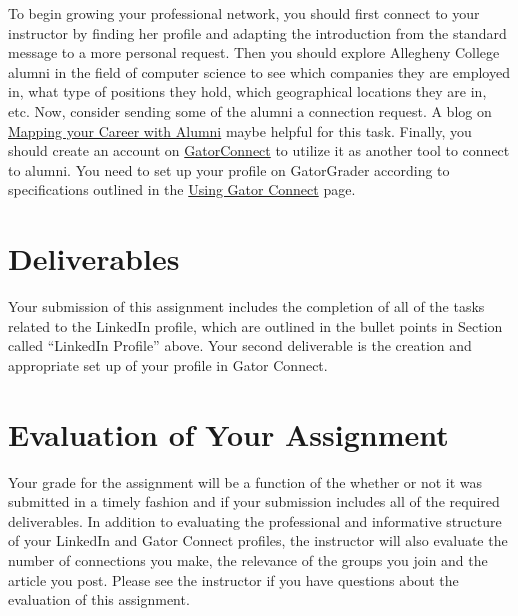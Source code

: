 \documentclass[11pt]{article}
\begin{document}
To begin growing your professional network, you should first connect to your instructor by finding her profile and adapting the introduction from the standard  message to a more personal request. Then you should explore Allegheny College alumni in the field of computer science to see which companies they are employed in, what type of positions they hold, which geographical locations they are in, etc. Now, consider sending some of the alumni a connection request.  A blog on \href{https://blog.linkedin.com/2013/01/30/start-mapping-your-career-with-linkedin-alumni}{Mapping your Career with Alumni} maybe helpful for this task. Finally, you should create an account on \href{https://sites.allegheny.edu/gatorconnect/}{GatorConnect} to utilize it as another tool to connect to alumni. You need to set up your profile on GatorGrader according to specifications outlined in the \href{https://sites.allegheny.edu/gatorconnect/using-gator-connect/#updateprofile}{Using  Gator Connect} page.

\section*{Deliverables}
Your submission of this  assignment includes the completion of all of the tasks related to the LinkedIn profile, which are outlined in the bullet points in Section called ``LinkedIn Profile'' above. Your second deliverable is the creation and appropriate set up of your profile in Gator Connect.

\section*{Evaluation of Your  Assignment}

 Your grade for the assignment will be a function of the
whether or not it was submitted in a timely fashion and if your submission includes all of the required deliverables. In addition to evaluating the professional and informative structure of your LinkedIn and Gator Connect profiles, the instructor will also evaluate the number of connections you make, the relevance of the groups you join and the article you post.
 Please see the instructor if you have
questions about the evaluation of this  assignment.
\end{document}
